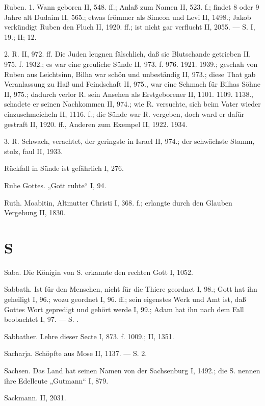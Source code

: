 Ruben. 1.  Wann geboren II, 548. ff.; Anlaß zum Namen II, 523. f.; findet 8 oder 9 Jahre alt Dudaim II, 565.; etwas frömmer als Simeon und Levi II, 1498.; Jakob verkündigt Ruben den Fluch II, 1920. ff.; ist nicht gar verflucht II, 2055. — S.  I, 19.; II;  12.

2. R.  II, 972. ff. Die Juden leugnen fälschlich, daß sie Blutschande getrieben II, 975. f. 1932.; es war eine greuliche Sünde II, 973. f. 976. 1921. 1939.; geschah von Ruben aus Leichtsinn, Bilha war schön und unbeständig II, 973.; diese That gab Veranlassung zu Haß und Feindschaft II, 975., war eine Schmach für Bilhas Söhne II, 975.; dadurch verlor R. sein Ansehen als Erstgeborener II, 1101. 1109. 1138., schadete er seinen Nachkommen II, 974.; wie
R. versuchte, sich beim Vater wieder einzuschmeicheln II, 1116. f.; die Sünde war R. vergeben, doch ward er dafür gestraft II, 1920. ff., Anderen zum Exempel II, 1922. 1934.

3.  R. Schwach, verachtet, der geringste in Israel II, 974.; der schwächste Stamm, stolz, faul II, 1933.

Rückfall in Sünde ist gefährlich I, 276.

Ruhe Gottes. „Gott ruhte“ I, 94.

Ruth. Moabitin, Altmutter Christi I, 368. f.; erlangte durch den Glauben Vergebung II, 1830.

\section{S}

Saba. Die Königin von S. erkannte den rechten Gott I, 1052.

Sabbath. Ist für den Menschen, nicht für die Thiere geordnet I, 98.; Gott hat ihn geheiligt I, 96.; wozu geordnet I, 96. ff.; sein eigenstes Werk und Amt ist, daß Gottes Wort gepredigt und gehört werde I, 99.; Adam hat ihn nach dem Fall beobachtet I, 97. — S. .

Sabbather. Lehre dieser Secte I, 873. f. 1009.; II, 1351.

Sacharja. Schöpfte aus Mose II, 1137. — S.  2.

Sachsen. Das Land hat seinen Namen von der Sachsenburg I, 1492.; die S. nennen ihre Edelleute „Gutmann“ I, 879.

Sackmann. II, 2031.

